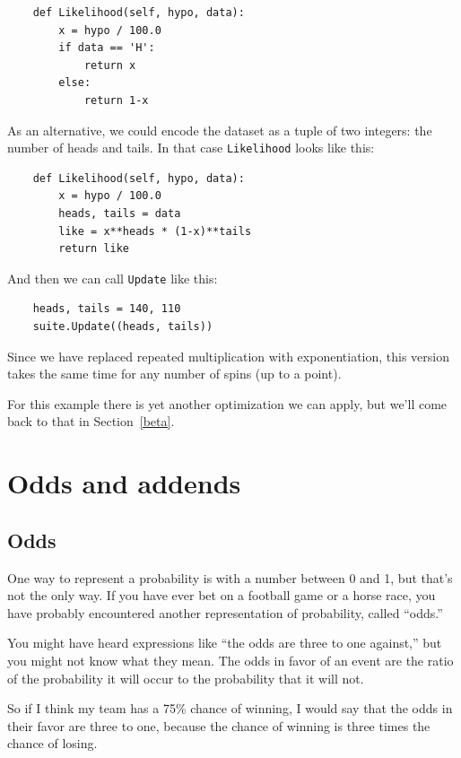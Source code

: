 \documentclass[12pt]{book}
\begin{document}
\begin{verbatim}
    def Likelihood(self, hypo, data):
        x = hypo / 100.0
        if data == 'H':
            return x
        else:
            return 1-x
\end{verbatim}

As an alternative, we could encode the dataset as a tuple of 
two integers: the number of heads and tails.
In that case \verb"Likelihood" looks like this:

\begin{verbatim}
    def Likelihood(self, hypo, data):
        x = hypo / 100.0
        heads, tails = data
        like = x**heads * (1-x)**tails
        return like
\end{verbatim}

And then we can call \verb"Update" like this:

\begin{verbatim}
    heads, tails = 140, 110
    suite.Update((heads, tails))
\end{verbatim}

Since we have replaced repeated multiplication with exponentiation,
this version takes the same time for any number of spins (up
to a point).

For this example there is yet another optimization we can apply,
but we'll come back to that in Section~\ref{beta}.


\chapter{Odds and addends}

\section{Odds}

One way to represent a probability is with a number between
0 and 1, but that's not the only way.  If you have ever bet
on a football game or a horse race, you have probably encountered
another representation of probability, called ``odds.''

You might have heard expressions like ``the odds are
three to one against,'' but you might not know what they mean.  
The odds in favor of an event are the ratio of the probability
it will occur to the probability that it will not.

So if I think my team has a 75\% chance of winning, I would
say that the odds in their favor are three to one, because
the chance of winning is three times the chance of losing.
\end{document}

